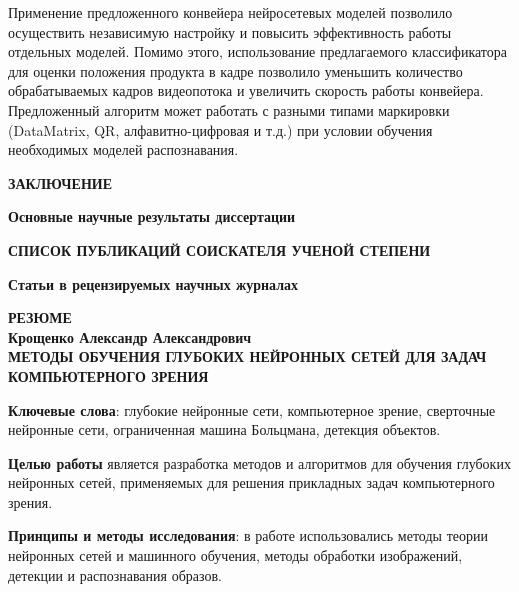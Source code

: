 \documentclass{thesisby}
\begin{document}
Применение предложенного конвейера нейросетевых моделей позволило осуществить независимую настройку и повысить эффективность работы отдельных моделей. Помимо этого, использование предлагаемого классификатора для оценки положения продукта в кадре позволило уменьшить количество обрабатываемых кадров видеопотока и увеличить скорость работы конвейера. Предложенный алгоритм может работать с разными типами маркировки (DataMatrix, QR, алфавитно-цифровая и т.д.) при условии обучения необходимых моделей распознавания.

\bigskip
\centerline{\bf ЗАКЛЮЧЕНИЕ}
\smallskip
{\bf Основные научные результаты диссертации}
\smallskip



\medskip



\newpage

\def\selectlanguageifdefined#1{
\expandafter\ifx\csname date#1\endcsname\relax
\else\language\csname l@#1\endcsname\fi}

\bigskip
\centerline{\bf СПИСОК ПУБЛИКАЦИЙ СОИСКАТЕЛЯ УЧЕНОЙ СТЕПЕНИ}

\vspace{1mm}
{\bf Статьи в рецензируемых научных журналах}
\vspace{2mm}

\begin{enumerate}[wide, labelindent=10mm]



\end{enumerate}

\newpage
\begin{center}
\bf РЕЗЮМЕ
\\[1mm]\rm Крощенко Александр Александрович\\[1mm] \bf
МЕТОДЫ ОБУЧЕНИЯ ГЛУБОКИХ НЕЙРОННЫХ СЕТЕЙ ДЛЯ ЗАДАЧ КОМПЬЮТЕРНОГО ЗРЕНИЯ
 \end{center}

{\bf Ключевые слова}: глубокие нейронные сети, компьютерное зрение, сверточные нейронные сети, ограниченная машина Больцмана, детекция объектов.

\textbf{Целью работы} является разработка методов и алгоритмов для обучения глубоких нейронных сетей, применяемых для решения прикладных задач компьютерного зрения.

\textbf{Принципы и методы исследования}: в работе использовались методы теории нейронных сетей и машинного обучения, методы обработки изображений, детекции и распознавания образов.
\end{document}

